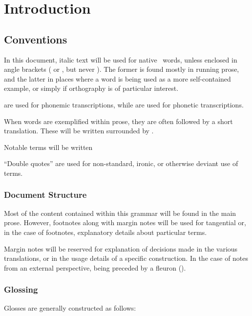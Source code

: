 \chapter{Introduction}\label{ch:introduction}
\section{Conventions}\label{sec:conventions}
In this document, italic text will be used for native \langname\ words, unless enclosed in angle brackets ( or , but never ).
The former is found mostly in running prose, and the latter in places where a word is being used as a more self-contained example, or simply if orthography is of particular interest.

 are used for phonemic transcriptions, while  are used for phonetic transcriptions.

When words are exemplified within prose, they are often followed by a short translation. These will be written surrounded by .

Notable terms will be written 

``Double quotes'' are used for non-standard, ironic, or otherwise deviant use of terms.

\subsection{Document Structure}
Most of the content contained within this grammar will be found in the main prose. However, footnotes along with margin notes will be used for tangential or, in the case of footnotes, explanatory details about particular terms.

Margin notes will be reserved for explanation of decisions made in the various translations, or in the usage details of a specific construction.
In the case of notes from an external perspective, being preceded by a fleuron (\fleuron).

\subsection{Glossing}\label{sec:conventions-gloss}
Glosses are generally constructed as follows:

